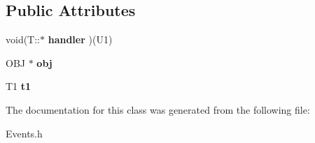\subsection*{Public Attributes}
\begin{DoxyCompactItemize}
\item 
\hypertarget{class_event1_a2a02ab5cbd37a2879c3db25cf3faf80f}{void(T\-::$\ast$ {\bfseries handler} )(U1)}\label{class_event1_a2a02ab5cbd37a2879c3db25cf3faf80f}

\item 
\hypertarget{class_event1_adc793df07c00b32a012cf45b31b9d2e6}{O\-B\-J $\ast$ {\bfseries obj}}\label{class_event1_adc793df07c00b32a012cf45b31b9d2e6}

\item 
\hypertarget{class_event1_a1af2759e05940a423f3b9409feab75f9}{T1 {\bfseries t1}}\label{class_event1_a1af2759e05940a423f3b9409feab75f9}

\end{DoxyCompactItemize}


The documentation for this class was generated from the following file\-:\begin{DoxyCompactItemize}
\item 
Events.\-h\end{DoxyCompactItemize}
